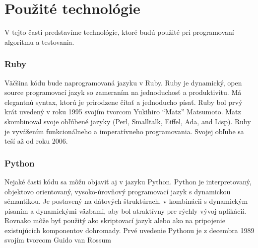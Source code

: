\section{Použité technológie} 
V tejto časti predstavíme technológie, ktoré budú použité pri programovaní algoritmu a testovania. 
\subsubsection{Ruby} 
Väčšina kódu bude naprogramovaná jazyku v Ruby. Ruby je dynamický, open source programovací jazyk so zameraním na jednoduchosť a produktivitu. Má elegantnú syntax, ktorú je prirodzene čítať a jednoducho písať. Ruby bol prvý krát uvedený v roku 1995 svojím tvorcom Yukihiro “Matz” Matsumoto. Matz skombinoval svoje obľúbené jazyky (Perl, Smalltalk, Eiffel, Ada, and Lisp). Ruby je vyvážením funkcionálneho a imperatívneho programovania. Svojej obľube sa teší až od roku 2006.\cite{Rb} 
\subsubsection{Python} 
Nejaké časti kódu sa môžu objaviť aj v jazyku Python. Python je interpretovaný, objektovo orientovaný, vysoko-úrovňový programovací jazyk s dynamickou sémantikou. Je postavený na dátových štruktúrach, v kombinácii s dynamickým písaním a dynamickými väzbami, aby bol atraktívny pre rýchly vývoj aplikácií. Rovnako môže byť použitý ako skriptovací jazyk alebo ako  na pripojenie existujúcich komponentov dohromady. Prvé uvedenie Pythonu je z decembra 1989 svojím tvorcom Guido van Rossum\cite{Pt} 

